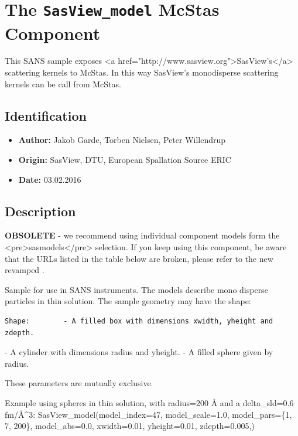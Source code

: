 \section{The \texttt{SasView\_model} McStas Component}
This SANS sample exposes \textless{}a href="http://www.sasview.org"\textgreater{}SasView's\textless{}/a\textgreater{} scattering kernels to McStas. In this way SasView's monodisperse scattering kernels can be call from McStas.

\subsection*{Identification}
\begin{itemize}
  \item \textbf{Author:} Jakob Garde, Torben Nielsen, Peter Willendrup
  \item \textbf{Origin:} SasView, DTU, European Spallation Source ERIC
  \item \textbf{Date:} 03.02.2016
\end{itemize}

\subsection*{Description}
\textbf{OBSOLETE} - we recommend using individual component models form the \textless{}pre\textgreater{}sasmodels\textless{}/pre\textgreater{} selection. If you keep using this component, be aware that the URLs listed in the table below are broken, please refer to the new revamped .

Sample for use in SANS instruments. The models describe mono disperse particles in thin solution. The sample geometry may have the shape:

\begin{verbatim}
Shape:        - A filled box with dimensions xwidth, yheight and zdepth.
\end{verbatim}

- A cylinder with dimensions radius and yheight. - A filled sphere given by radius.

These parameters are mutually exclusive.

Example using spheres in thin solution, with radius=200 \AA{} and a delta\_sld=0.6 fm/\AA{}\textasciicircum{}3: SasView\_model(model\_index=47, model\_scale=1.0, model\_pars=\{1, 7, 200\}, model\_abs=0.0, xwidth=0.01, yheight=0.01, zdepth=0.005,)

